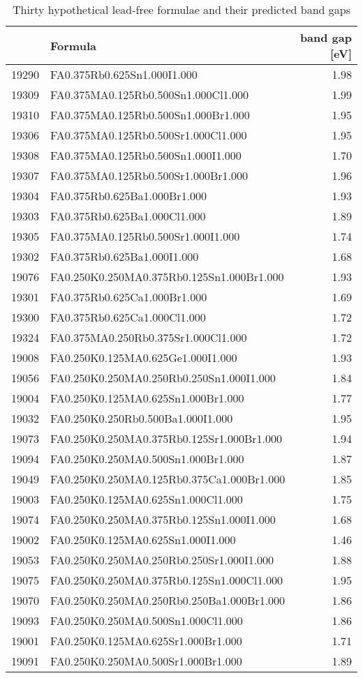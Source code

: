  
\begin{table}[htbp]
\caption{\label{tbl:pbfree} Thirty hypothetical lead-free formulae and their predicted band gaps}
\centering
\begin{tabular}{rlr}
 & Formula & band gap [eV]\\[0pt]
\hline
19290 & FA0.375Rb0.625Sn1.000I1.000 & 1.98\\[0pt]
19309 & FA0.375MA0.125Rb0.500Sn1.000Cl1.000 & 1.99\\[0pt]
19310 & FA0.375MA0.125Rb0.500Sn1.000Br1.000 & 1.95\\[0pt]
19306 & FA0.375MA0.125Rb0.500Sr1.000Cl1.000 & 1.95\\[0pt]
19308 & FA0.375MA0.125Rb0.500Sn1.000I1.000 & 1.70\\[0pt]
19307 & FA0.375MA0.125Rb0.500Sr1.000Br1.000 & 1.96\\[0pt]
19304 & FA0.375Rb0.625Ba1.000Br1.000 & 1.93\\[0pt]
19303 & FA0.375Rb0.625Ba1.000Cl1.000 & 1.89\\[0pt]
19305 & FA0.375MA0.125Rb0.500Sr1.000I1.000 & 1.74\\[0pt]
19302 & FA0.375Rb0.625Ba1.000I1.000 & 1.68\\[0pt]
19076 & FA0.250K0.250MA0.375Rb0.125Sn1.000Br1.000 & 1.93\\[0pt]
19301 & FA0.375Rb0.625Ca1.000Br1.000 & 1.69\\[0pt]
19300 & FA0.375Rb0.625Ca1.000Cl1.000 & 1.72\\[0pt]
19324 & FA0.375MA0.250Rb0.375Sr1.000Cl1.000 & 1.72\\[0pt]
19008 & FA0.250K0.125MA0.625Ge1.000I1.000 & 1.93\\[0pt]
19056 & FA0.250K0.250MA0.250Rb0.250Sn1.000I1.000 & 1.84\\[0pt]
19004 & FA0.250K0.125MA0.625Sn1.000Br1.000 & 1.77\\[0pt]
19032 & FA0.250K0.250Rb0.500Ba1.000I1.000 & 1.95\\[0pt]
19073 & FA0.250K0.250MA0.375Rb0.125Sr1.000Br1.000 & 1.94\\[0pt]
19094 & FA0.250K0.250MA0.500Sn1.000Br1.000 & 1.87\\[0pt]
19049 & FA0.250K0.250MA0.125Rb0.375Ca1.000Br1.000 & 1.85\\[0pt]
19003 & FA0.250K0.125MA0.625Sn1.000Cl1.000 & 1.75\\[0pt]
19074 & FA0.250K0.250MA0.375Rb0.125Sn1.000I1.000 & 1.68\\[0pt]
19002 & FA0.250K0.125MA0.625Sn1.000I1.000 & 1.46\\[0pt]
19053 & FA0.250K0.250MA0.250Rb0.250Sr1.000I1.000 & 1.88\\[0pt]
19075 & FA0.250K0.250MA0.375Rb0.125Sn1.000Cl1.000 & 1.95\\[0pt]
19070 & FA0.250K0.250MA0.250Rb0.250Ba1.000Br1.000 & 1.86\\[0pt]
19093 & FA0.250K0.250MA0.500Sn1.000Cl1.000 & 1.86\\[0pt]
19001 & FA0.250K0.125MA0.625Sr1.000Br1.000 & 1.71\\[0pt]
19091 & FA0.250K0.250MA0.500Sr1.000Br1.000 & 1.89\\[0pt]
\end{tabular}
\end{table}
